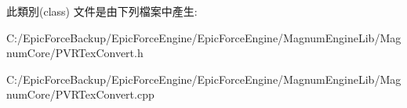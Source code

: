 此類別(class) 文件是由下列檔案中產生\+:\begin{DoxyCompactItemize}
\item 
C\+:/\+Epic\+Force\+Backup/\+Epic\+Force\+Engine/\+Epic\+Force\+Engine/\+Magnum\+Engine\+Lib/\+Magnum\+Core/P\+V\+R\+Tex\+Convert.\+h\item 
C\+:/\+Epic\+Force\+Backup/\+Epic\+Force\+Engine/\+Epic\+Force\+Engine/\+Magnum\+Engine\+Lib/\+Magnum\+Core/P\+V\+R\+Tex\+Convert.\+cpp\end{DoxyCompactItemize}
